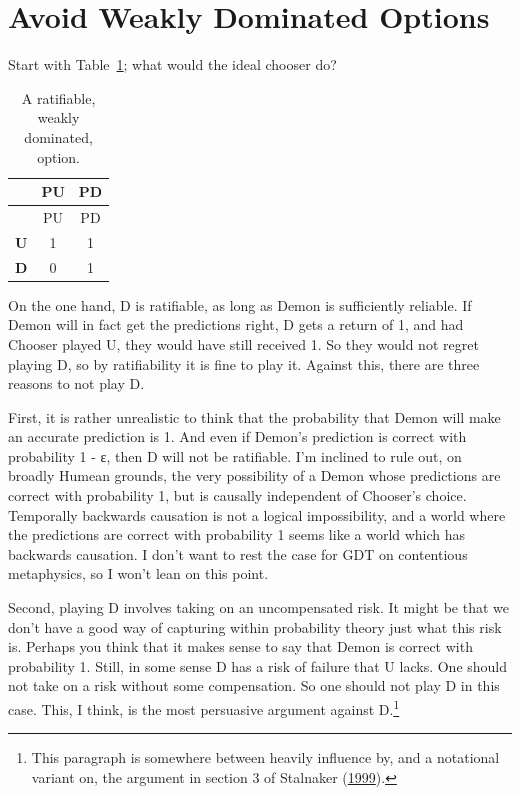 \documentclass[
  12pt,
  letterpaper,
  DIV=11,
  numbers=noendperiod]{scrreprt}
\begin{document}
\hypertarget{sec-weak-avoid}{%
\section{Avoid Weakly Dominated Options}\label{sec-weak-avoid}}

Start with Table~\ref{tbl-first-wd}; what would the ideal chooser do?

\hypertarget{tbl-first-wd}{}
\begin{longtable}[]{@{}ccc@{}}
\caption{\label{tbl-first-wd}A ratifiable, weakly dominated,
option.}\tabularnewline
\toprule\noalign{}
& PU & PD \\
\midrule\noalign{}
\endfirsthead
\toprule\noalign{}
& PU & PD \\
\midrule\noalign{}
\endhead
\bottomrule\noalign{}
\endlastfoot
\textbf{U} & 1 & 1 \\
\textbf{D} & 0 & 1 \\
\end{longtable}

On the one hand, D is ratifiable, as long as Demon is sufficiently
reliable. If Demon will in fact get the predictions right, D gets a
return of 1, and had Chooser played U, they would have still received 1.
So they would not regret playing D, so by ratifiability it is fine to
play it. Against this, there are three reasons to not play D.

First, it is rather unrealistic to think that the probability that Demon
will make an accurate prediction is 1. And even if Demon's prediction is
correct with probability 1 - ε, then D will not be ratifiable. I'm
inclined to rule out, on broadly Humean grounds, the very possibility of
a Demon whose predictions are correct with probability 1, but is
causally independent of Chooser's choice. Temporally backwards causation
is not a logical impossibility, and a world where the predictions are
correct with probability 1 seems like a world which has backwards
causation. I don't want to rest the case for GDT on contentious
metaphysics, so I won't lean on this point.

Second, playing D involves taking on an uncompensated risk. It might be
that we don't have a good way of capturing within probability theory
just what this risk is. Perhaps you think that it makes sense to say
that Demon is correct with probability 1. Still, in some sense D has a
risk of failure that U lacks. One should not take on a risk without some
compensation. So one should not play D in this case. This, I think, is
the most persuasive argument against D.\footnote{This paragraph is
  somewhere between heavily influence by, and a notational variant on,
  the argument in section 3 of Stalnaker
  (\protect\hyperlink{ref-Stalnaker1999}{1999}).}
\end{document}
